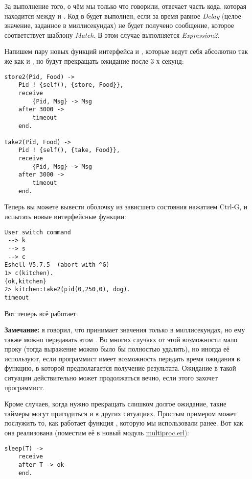 За выполнение того, о чём мы только что говорили, отвечает часть кода, которая находится между  и .
Код в  будет выполнен, если за время равное \emph{Delay} (целое значение, заданное в миллисекундах) не будет получено сообщение, которое соответствует шаблону \emph{Match}.
В этом случае выполняется \emph{Expression2}.

Напишем пару новых функций интерфейса  и , которые ведут себя абсолютно так же как  и , но будут прекращать ожидание после 3\--х секунд:
\begin{lstlisting}[style=erlang]
store2(Pid, Food) ->
    Pid ! {self(), {store, Food}},
    receive
        {Pid, Msg} -> Msg
    after 3000 ->
        timeout
    end.
 
take2(Pid, Food) ->
    Pid ! {self(), {take, Food}},
    receive
        {Pid, Msg} -> Msg
    after 3000 ->
        timeout
    end.
\end{lstlisting}

Теперь вы можете вывести оболочку из зависшего состояния нажатием Ctrl-G, и испытать новые интерфейсные функции:
\begin{lstlisting}[style=erlang]
User switch command
 --> k
 --> s
 --> c
Eshell V5.7.5  (abort with ^G)
1> c(kitchen).
{ok,kitchen}
2> kitchen:take2(pid(0,250,0), dog).
timeout
\end{lstlisting}

Вот теперь всё работает.\\
\colorbox{lgray}
{
\begin{minipage}{1.0\linewidth}
    \textbf{Замечание:} я говорил, что  принимает значения только в миллисекундах, но ему также можно передавать атом .
    Во многих случаях от этой возможности мало проку (тогда выражение  можно было бы полностью удалить), но иногда её используют, если программист имеет возможность передать время ожидания в функцию, в которой предполагается получение результата.
    Ожидание в такой ситуации действительно может продолжаться вечно, если этого захочет программист.
\end{minipage}
}

Кроме случаев, когда нужно прекращать слишком долгое ожидание, такие таймеры могут пригодиться и в других ситуациях.
Простым примером может послужить то, как работает функция , которую мы использовали ранее.
Вот как она реализована (поместим её в новый модуль \href{http://learnyousomeerlang.com/static/erlang/multiproc.erl}{multiproc.erl}):
\begin{lstlisting}[style=erlang]
sleep(T) ->
    receive
    after T -> ok
    end.
\end{lstlisting}

